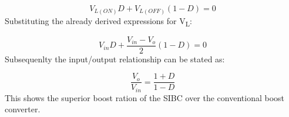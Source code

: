 \begin{equation}
	V_{L(ON)}D+V_{L(OFF)}(1-D)=0
	\label{eq:SI_IVSB}
\end{equation}
Substituting the already derived expressions for V\textsubscript{L}:

\begin{equation}
	V_{in}D+\frac{V_{in} - V_o}{2}(1-D)=0
	\label{eq:SI_IVSB2}
\end{equation}
Subsequenlty the input/output relationship can be stated as:

\begin{equation}
	\frac{V_o}{V_{in}} = \frac{1+D}{1-D}
	\label{eq:SI_VO_VIN}
\end{equation}
This shows the superior boost ration of the SIBC over the conventional boost converter. 


